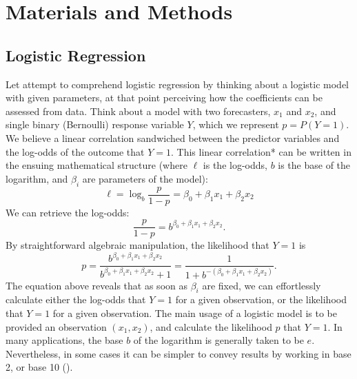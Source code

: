 \documentclass[12pt]{article}
\begin{document}
\section{Materials and Methods}
\subsection{Logistic Regression}
Let attempt to comprehend logistic regression by thinking about a logistic model with given parameters, at that point perceiving how the coefficients can be assessed from data. Think about a model with two forecasters, {${\displaystyle x_{1}}$} and {${\displaystyle x_{2}}$}, and single binary (Bernoulli) response variable {${\displaystyle Y}$}, which we represent {${\displaystyle p=P(Y=1)}$}. We believe a linear correlation sandwiched between the predictor variables and the log-odds of the outcome that {${\displaystyle Y=1}$}. This linear correlation* can be written in the ensuing mathematical structure (where {${\displaystyle \ell}$} is the log-{}odds, {${\displaystyle b}$} is the base of the logarithm, and {${\displaystyle \beta _{i}}$} are parameters of the model):
\begin{equation}
	{{\displaystyle \ell =\log _{b}{\frac {p}{1-p}}=\beta _{0}+\beta _{1}x_{1}+\beta _{2}x_{2}}}
\end{equation}
We can retrieve the log-odds:
\begin{equation}
	{{\displaystyle {\frac {p}{1-p}}=b^{\beta _{0}+\beta _{1}x_{1}+\beta _{2}x_{2}}}}.
\end{equation}
By straightforward algebraic manipulation, the likelihood that {${\displaystyle Y=1}$} is
\begin{equation}
	{{\displaystyle p={\frac {b^{\beta _{0}+\beta _{1}x_{1}+\beta _{2}x_{2}}}{b^{\beta _{0}+\beta _{1}x_{1}+\beta _{2}x_{2}}+1}}={\frac {1}{1+b^{-(\beta _{0}+\beta _{1}x_{1}+\beta _{2}x_{2})}}}}}.
\end{equation}
The equation above reveals that as soon as {${\displaystyle \beta _{i}}$} are fixed, we can effortlessly calculate either the log-odds that {${\displaystyle Y=1}$} for a given observation, or the likelihood that {${\displaystyle Y=1}$} for a given observation. The main usage of a logistic model is to be provided an observation {${\displaystyle (x_{1},x_{2})}$}, and calculate the likelihood {${\displaystyle p}$} that {${\displaystyle Y=1}$}. In many applications, the base {${\displaystyle b}$} of the logarithm is generally taken to be {${\displaystyle e}$}. Nevertheless, in some cases it can be simpler to convey results by working in base 2, or base 10 (\cite{ref-wiki:xxx}).
\end{document}
